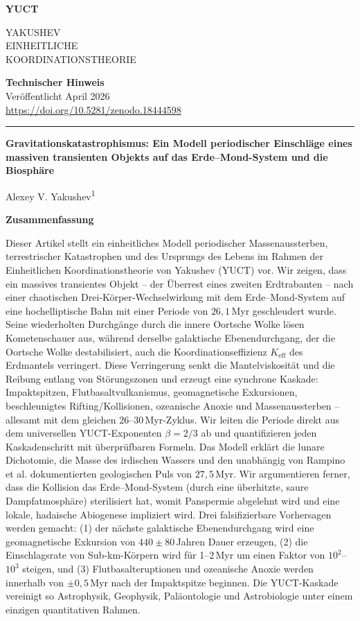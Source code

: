 \documentclass[11pt,a4paper]{article}
\newcommand{\makeheader}{%
	\noindent
	\begin{minipage}{0.17\textwidth}
		\raggedright
		{\sffamily\bfseries\color{skyblue}\fontsize{46}{46}\selectfont YUCT}%
	\end{minipage}%
	\hspace{30pt}
	\begin{minipage}{0.32\textwidth}
		\raggedright
		{\sffamily\fontsize{11}{13}\selectfont YAKUSHEV\\ EINHEITLICHE\\ KOORDINATIONSTHEORIE}%
	\end{minipage}%
	\hfill
	\begin{minipage}{0.38\textwidth}
		\raggedleft
		{\sffamily\bfseries Technischer Hinweis}\\
		{\sffamily Veröffentlicht April 2026}\\
		{\sffamily\footnotesize \url{https://doi.org/10.5281/zenodo.18444598}}%
	\end{minipage}
	\par\vspace{5pt}
	\noindent\textcolor{gold}{\rule{\textwidth}{1.6pt}}
	\par\vspace{0pt}
}
\begin{document}
	\thispagestyle{firstpage}
	\makeheader
	
	\vspace{0cm}
	{\LARGE\bfseries Gravitationskatastrophismus: Ein Modell periodischer Einschläge eines massiven transienten Objekts auf das Erde–Mond-System und die Biosphäre \par}
	\vspace{0.2cm}
	
	{\large Alexey V. Yakushev\textsuperscript{1}} \\
	\vspace{0.0cm}
	
	{\color{darkblue}\textbf{\LARGE Zusammenfassung}} \par
	{\large
		\noindent
		Dieser Artikel stellt ein einheitliches Modell periodischer Massenaussterben, terrestrischer Katastrophen und des Ursprungs des Lebens im Rahmen der Einheitlichen Koordinationstheorie von Yakushev (YUCT) vor. Wir zeigen, dass ein massives transientes Objekt – der Überrest eines zweiten Erdtrabanten – nach einer chaotischen Drei‑Körper‑Wechselwirkung mit dem Erde–Mond-System auf eine hochelliptische Bahn mit einer Periode von \(26,1\) Myr geschleudert wurde. Seine wiederholten Durchgänge durch die innere Oortsche Wolke lösen Kometenschauer aus, während derselbe galaktische Ebenendurchgang, der die Oortsche Wolke destabilisiert, auch die Koordinationseffizienz \(K_{\mathrm{eff}}\) des Erdmantels verringert. Diese Verringerung senkt die Mantelviskosität und die Reibung entlang von Störungszonen und erzeugt eine synchrone Kaskade: Impaktspitzen, Flutbasaltvulkanismus, geomagnetische Exkursionen, beschleunigtes Rifting/Kollisionen, ozeanische Anoxie und Massenaussterben – allesamt mit dem gleichen \(26\)–\(30\) Myr-Zyklus. Wir leiten die Periode direkt aus dem universellen YUCT-Exponenten \(\beta = 2/3\) ab und quantifizieren jeden Kaskadenschritt mit überprüfbaren Formeln. Das Modell erklärt die lunare Dichotomie, die Masse des irdischen Wassers und den unabhängig von Rampino et al. dokumentierten geologischen Puls von \(27,5\) Myr. Wir argumentieren ferner, dass die Kollision das Erde–Mond-System (durch eine überhitzte, saure Dampfatmosphäre) sterilisiert hat, womit Panspermie abgelehnt wird und eine lokale, hadaische Abiogenese impliziert wird. Drei falsifizierbare Vorhersagen werden gemacht: (1) der nächste galaktische Ebenendurchgang wird eine geomagnetische Exkursion von \(440 \pm 80\) Jahren Dauer erzeugen, (2) die Einschlagsrate von Sub‑km-Körpern wird für 1–2 Myr um einen Faktor von \(10^{2}\)–\(10^{3}\) steigen, und (3) Flutbasalteruptionen und ozeanische Anoxie werden innerhalb von \(\pm 0,5\) Myr nach der Impaktspitze beginnen. Die YUCT-Kaskade vereinigt so Astrophysik, Geophysik, Paläontologie und Astrobiologie unter einem einzigen quantitativen Rahmen.}
	
\end{document}
